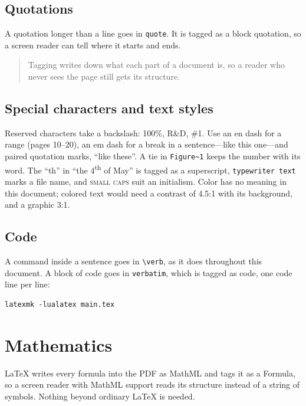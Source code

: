 \documentclass[12pt]{article}
\begin{document}
\subsection{Quotations}
A quotation longer than a line goes in \texttt{quote}. It is tagged as a block
quotation, so a screen reader can tell where it starts and ends.
\begin{quote}
  Tagging writes down what each part of a document is, so a reader who never
  sees the page still gets its structure.
\end{quote}
\subsection{Special characters and text styles}
Reserved characters take a backslash: 100\%, R\&D, \#1. Use an en dash for a
range (pages 10--20), an em dash for a break in a sentence---like this one---and
paired quotation marks, ``like these''. A tie in \verb|Figure~1| keeps the
number with its word. The ``th'' in ``the 4\textsuperscript{th} of May'' is
tagged as a superscript, \texttt{typewriter text} marks a file name, and
\textsc{small caps} suit an initialism. Color has no meaning in this document;
colored text would need a contrast of 4.5:1 with its background, and a graphic
3:1.
\subsection{Code}
A command inside a sentence goes in \verb|\verb|, as it does throughout this
document. A block of code goes in \texttt{verbatim}, which is tagged as code,
one code line per line:
\begin{verbatim}
latexmk -lualatex main.tex
\end{verbatim}

\section{Mathematics}
\label{sec:math}
LaTeX writes every formula into the PDF as MathML and tags it as a Formula, so
a screen reader with MathML support reads its structure instead of a string of
symbols. Nothing beyond ordinary LaTeX is needed.
\end{document}
